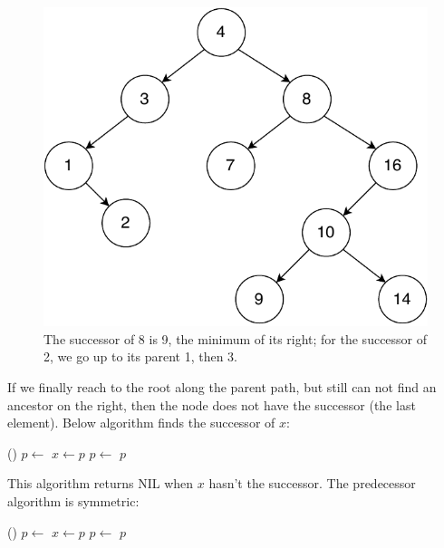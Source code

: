 \documentclass[b5paper]{article}
\begin{document}
\begin{figure}[htbp]
  \centering
  \includegraphics[scale=0.5]{img/bst-example}
  \caption{The successor of 8 is 9, the minimum of its right; for the successor of 2, we go up to its parent 1, then 3.} \label{fig:bst-succ}
\end{figure}

If we finally reach to the root along the parent path, but still can not find an ancestor on the right, then the node does not have the successor (the last element). Below algorithm finds the successor of $x$:

\begin{algorithmic}[1]
    \State \Return {}()
  \Else
    \State $p \gets $ 
      \State $x \gets p$
      \State $p \gets $ 
    \EndWhile
    \State \Return $p$
  \EndIf
\EndFunction
\end{algorithmic}

This algorithm returns NIL when $x$ hasn't the successor. The predecessor algorithm is symmetric:

\begin{algorithmic}[1]
    \State \Return {}()
  \Else
    \State $p \gets $ 
      \State $x \gets p$
      \State $p \gets $ 
    \EndWhile
    \State \Return $p$
  \EndIf
\EndFunction
\end{algorithmic}
\end{document}
